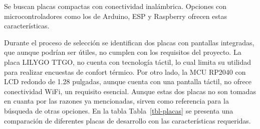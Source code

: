 \documentclass[
  letterpaper,
  DIV=11,
  numbers=noendperiod]{scrreport}
\begin{document}
Se buscan placas compactas con conectividad inalámbrica. Opciones con
microcontroladores como los de Arduino, ESP y Raspberry ofrecen estas
características.

Durante el proceso de selección se identifican dos placas con pantallas
integradas, que aunque podrían ser útiles, no cumplen con los requisitos
del proyecto. La placa LILYGO TTGO, no cuenta con tecnología táctil, lo
cual limita su utilidad para realizar encuestas de confort térmico. Por
otro lado, la MCU RP2040 con LCD redondo de 1.28 pulgadas, aunque cuenta
con una pantalla táctil, no ofrece conectividad WiFi, un requisito
esencial. Aunque estas dos placas no son tomadas en cuanta por las
razones ya mencionadas, sirven como referencia para la búsqueda de otras
opciones. En la tabla Tabla~\ref{tbl-placas} se presenta una comparación
de diferentes placas de desarrollo con las características requeridas.
\end{document}
